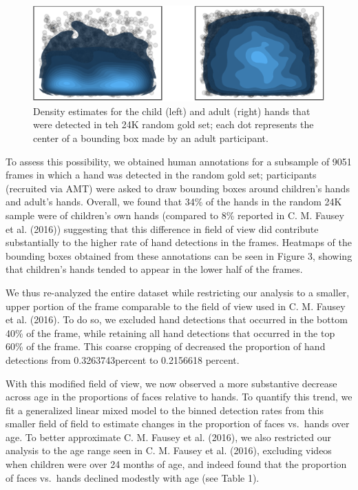\documentclass[10pt, letterpaper]{article}
\newenvironment{CodeChunk}{}{}
\begin{document}
\begin{CodeChunk}
\begin{figure}[h]

{\centering \includegraphics{figs/density-1} 

}

\caption[Density estimates for the child (left) and adult (right) hands that were detected in teh 24K random gold set]{Density estimates for the child (left) and adult (right) hands that were detected in teh 24K random gold set; each dot represents the center of a bounding box made by an adult participant.}\label{fig:density}
\end{figure}
\end{CodeChunk}

To assess this possibility, we obtained human annotations for a
subsample of 9051 frames in which a hand was detected in the random gold
set; participants (recruited via AMT) were asked to draw bounding boxes
around children's hands and adult's hands. Overall, we found that 34\%
of the hands in the random 24K sample were of children's own hands
(compared to 8\% reported in C. M. Fausey et al. (2016)) suggesting that
this difference in field of view did contribute substantially to the
higher rate of hand detections in the frames. Heatmaps of the bounding
boxes obtained from these annotations can be seen in Figure 3, showing
that children's hands tended to appear in the lower half of the frames.

We thus re-analyzed the entire dataset while restricting our analysis to
a smaller, upper portion of the frame comparable to the field of view
used in C. M. Fausey et al. (2016). To do so, we excluded hand
detections that occurred in the bottom 40\% of the frame, while
retaining all hand detections that occurred in the top 60\% of the
frame. This coarse cropping of decreased the proportion of hand
detections from 0.3263743percent to 0.2156618 percent.

With this modified field of view, we now observed a more substantive
decrease across age in the proportions of faces relative to hands. To
quantify this trend, we fit a generalized linear mixed model to the
binned detection rates from this smaller field of field to estimate
changes in the proportion of faces vs.~hands over age. To better
approximate C. M. Fausey et al. (2016), we also restricted our analysis
to the age range seen in C. M. Fausey et al. (2016), excluding videos
when children were over 24 months of age, and indeed found that the
proportion of faces vs.~hands declined modestly with age (see Table 1).
\end{document}
